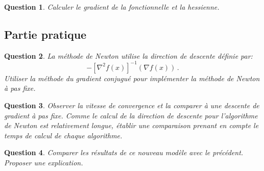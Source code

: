 \documentclass[10pt,a4paper,fleqn]{report}
\newtheorem{question}{Question}
\begin{document}
\begin{question}
Calculer le gradient de la fonctionnelle et la hessienne.
\end{question}

\subsection{Partie pratique}

\begin{question}
La m\'ethode de Newton utilise la direction de descente d\'efinie par:
$$ -[\nabla^2f(x)]^{-1}(\nabla f(x))\,.$$
Utiliser la m\'ethode du gradient conjugu\'e pour impl\'ementer la m\'ethode de Newton \`a pas fixe.
\end{question}

\begin{question}
Observer la vitesse de convergence et la comparer \`a une descente de gradient \`a pas fixe.
Comme le calcul de la direction de descente pour l'algorithme de Newton est relativement longue, \'etablir une comparaison prenant en compte le temps de calcul de chaque algorithme.
\end{question}

\begin{question}
Comparer les r\'esultats de ce nouveau mod\`ele avec le pr\'ec\'edent. Proposer une explication.
\end{question}
\end{document}
